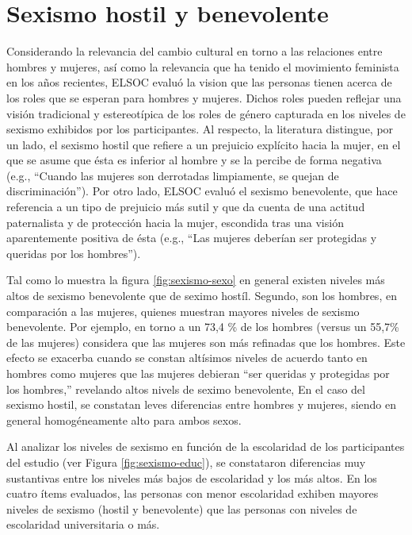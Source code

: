 \documentclass[
  12pt,
]{book}
\begin{document}
\hypertarget{sexismo-hostil-y-benevolente}{%
\section{Sexismo hostil y benevolente}\label{sexismo-hostil-y-benevolente}}

Considerando la relevancia del cambio cultural en torno a las relaciones entre hombres y mujeres, así como la relevancia que ha tenido el movimiento feminista en los años recientes, ELSOC evaluó la vision que las personas tienen acerca de los roles que se esperan para hombres y mujeres. Dichos roles pueden reflejar una visión tradicional y estereotípica de los roles de género capturada en los niveles de sexismo exhibidos por los participantes. Al respecto, la literatura distingue, por un lado, el sexismo hostil que refiere a un prejuicio explícito hacia la mujer, en el que se asume que ésta es inferior al hombre y se la percibe de forma negativa (e.g., ``Cuando las mujeres son derrotadas limpiamente, se quejan de discriminación''). Por otro lado, ELSOC evaluó el sexismo benevolente, que hace referencia a un tipo de prejuicio más sutil y que da cuenta de una actitud paternalista y de protección hacia la mujer, escondida tras una visión aparentemente positiva de ésta (e.g., ``Las mujeres deberían ser protegidas y queridas por los hombres'').

Tal como lo muestra la figura \ref{fig:sexismo-sexo} en general existen niveles más altos de sexismo benevolente que de seximo hostíl. Segundo, son los hombres, en comparación a las mujeres, quienes muestran mayores niveles de sexismo benevolente. Por ejemplo, en torno a un 73,4 \% de los hombres (versus un 55,7\% de las mujeres) considera que las mujeres son más refinadas que los hombres. Este efecto se exacerba cuando se constan altísimos niveles de acuerdo tanto en hombres como mujeres que las mujeres debieran ``ser queridas y protegidas por los hombres,'' revelando altos nivels de seximo benevolente, En el caso del sexismo hostil, se constatan leves diferencias entre hombres y mujeres, siendo en general homogéneamente alto para ambos sexos.

Al analizar los niveles de sexismo en función de la escolaridad de los participantes del estudio (ver Figura \ref{fig:sexismo-educ}), se constataron diferencias muy sustantivas entre los niveles más bajos de escolaridad y los más altos. En los cuatro ítems evaluados, las personas con menor escolaridad exhiben mayores niveles de sexismo (hostil y benevolente) que las personas con niveles de escolaridad universitaria o más.
\end{document}
